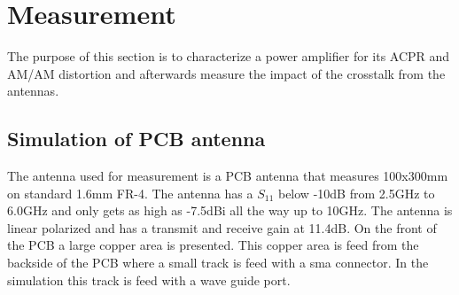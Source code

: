 \chapter{Measurement}\label{ch:measurement}
The purpose of this section is to characterize a power amplifier for its ACPR and AM/AM distortion and afterwards measure the impact of the crosstalk from the antennas. 

\section{Simulation of PCB antenna}
The antenna used for measurement is a PCB antenna that measures 100x300mm on standard 1.6mm FR-4. The antenna has a $S_{11}$ below -10dB from 2.5GHz to 6.0GHz and only gets as high as -7.5dBi all the way up to 10GHz. The antenna is linear polarized and has a transmit and receive gain at 11.4dB. On the front of the PCB a large copper area is presented. This copper area is feed from the backside of the PCB where a small track is feed with a sma connector. In the simulation this track is feed with a wave guide port.  
   
